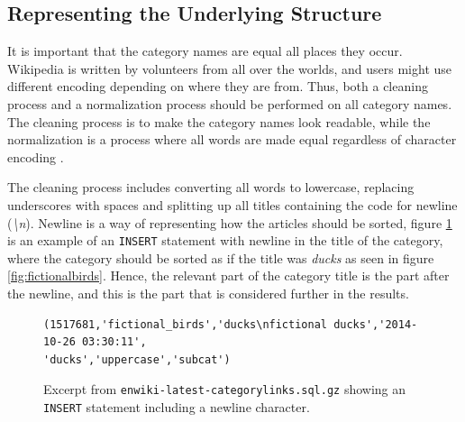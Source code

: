 \subsection{Representing the Underlying Structure}
It is important that the category names are equal all places they occur. Wikipedia is written by volunteers from all over the worlds, and users might use different encoding depending on where they are from. Thus, both a cleaning process and a normalization process should be performed on all category names. The cleaning process is to make the category names look readable, while the normalization is a process where all words are made equal regardless of character encoding \cite[p.~26]{iirbook}.

The cleaning process includes converting all words to lowercase, replacing underscores with spaces and splitting up all titles containing the code for newline (\emph{\textbackslash n}). Newline is a way of representing how the articles should be sorted, figure \ref{fig:withnewline} is an example of an \texttt{INSERT} statement with newline in the title of the category, where the category should be sorted as if the title was \emph{ducks} as seen in figure \ref{fig:fictionalbirds}. Hence, the relevant part of the category title is the part after the newline, and this is the part that is considered further in the results. 



\begin{figure}[h]
\begin{lstlisting}
(1517681,'fictional_birds','ducks\nfictional ducks','2014-10-26 03:30:11',
'ducks','uppercase','subcat')
\end{lstlisting}
\caption[\texttt{INSERT} statement with newline]{Excerpt from \texttt{enwiki-latest-categorylinks.sql.gz} showing an \texttt{INSERT} statement including a newline character. }
\label{fig:withnewline}
\end{figure}

